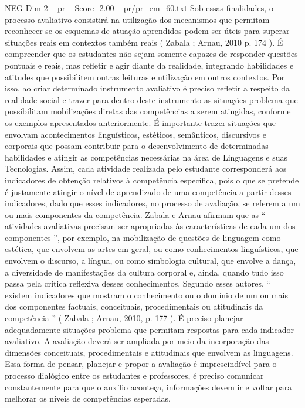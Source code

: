 \begin{textsample}{NEG Dim 2 – pr – Score -2.00 – pr/pr\_em\_60.txt}
Sob essas finalidades, o processo avaliativo consistirá na utilização dos mecanismos que permitam reconhecer se os esquemas de atuação aprendidos podem ser úteis para superar situações reais em contextos também reais ( Zabala ; Arnau, 2010 p. 174 ).
É compreender que os estudantes não sejam somente capazes de responder questões pontuais e reais, mas refletir e agir diante da realidade, integrando habilidades e atitudes que possibilitem outras leituras e utilização em outros contextos.
Por isso, ao criar determinado instrumento avaliativo é preciso refletir a respeito da realidade social e trazer para dentro deste instrumento as situações-problema que possibilitam mobilizações diretas das competências a serem atingidas, conforme os exemplos apresentados anteriormente.
É importante trazer situações que envolvam acontecimentos linguísticos, estéticos, semânticos, discursivos e corporais que possam contribuir para o desenvolvimento de determinadas habilidades e atingir as competências necessárias na área de Linguagens e suas Tecnologias.
Assim, cada atividade realizada pelo estudante corresponderá aos indicadores de obtenção relativos à competência específica, pois o que se pretende é justamente atingir o nível de aprendizado de uma competência a partir desses indicadores, dado que esses indicadores, no processo de avaliação, se referem a um ou mais componentes da competência.
Zabala e Arnau afirmam que as “ atividades avaliativas precisam ser apropriadas às características de cada um dos componentes ”, por exemplo, na mobilização de questões de linguagem como estética, que envolvem as artes em geral, ou como conhecimentos linguísticos, que envolvem o discurso, a língua, ou como simbologia cultural, que envolve a dança, a diversidade de manifestações da cultura corporal e, ainda, quando tudo isso passa pela crítica reflexiva desses conhecimentos.
Segundo esses autores, “ existem indicadores que mostram o conhecimento ou o domínio de um ou mais dos componentes factuais, conceituais, procedimentais ou atitudinais da competência ” ( Zabala ; Arnau, 2010, p. 177 ).
É preciso planejar adequadamente situações-problema que permitam respostas para cada indicador avaliativo.
A avaliação deverá ser ampliada por meio da incorporação das dimensões conceituais, procedimentais e atitudinais que envolvem as linguagens.
Essa forma de pensar, planejar e propor a avaliação é imprescindível para o processo dialógico entre os estudantes e professores, é preciso comunicar constantemente para que o auxílio aconteça, informações devem ir e voltar para melhorar os níveis de competências esperadas.

\end{textsample}
